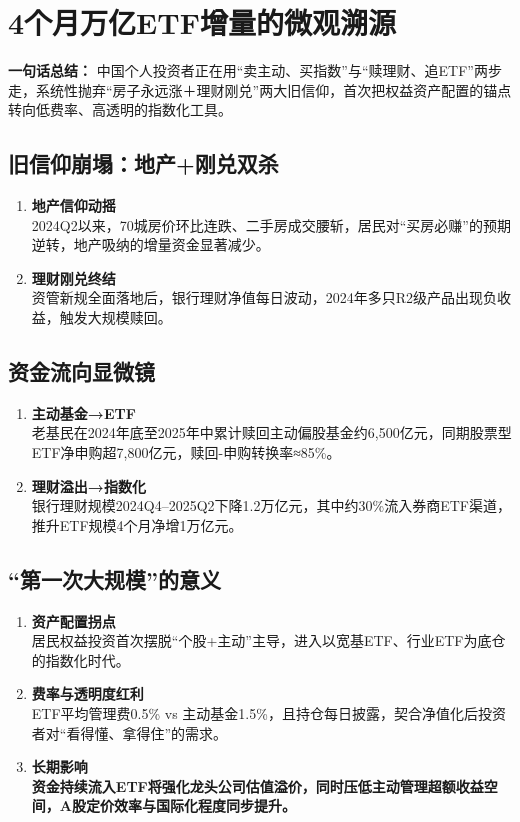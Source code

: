 \section{4个月万亿ETF增量的微观溯源}
\textbf{一句话总结：}  
中国个人投资者正在用“卖主动、买指数”与“赎理财、追ETF”两步走，系统性抛弃“房子永远涨＋理财刚兑”两大旧信仰，首次把权益资产配置的锚点转向低费率、高透明的指数化工具。

\subsection{旧信仰崩塌：地产+刚兑双杀}
\begin{enumerate}[leftmargin=*, nosep]
    \item \textbf{地产信仰动摇}  \\
    2024Q2以来，70城房价环比连跌、二手房成交腰斩，居民对“买房必赚”的预期逆转，地产吸纳的增量资金显著减少。
    \item \textbf{理财刚兑终结}  \\
    资管新规全面落地后，银行理财净值每日波动，2024年多只R2级产品出现负收益，触发大规模赎回。
\end{enumerate}

\subsection{资金流向显微镜}
\begin{enumerate}[leftmargin=*, nosep]
    \item \textbf{主动基金→ETF}  \\
    老基民在2024年底至2025年中累计赎回主动偏股基金约6,500亿元，同期股票型ETF净申购超7,800亿元，赎回-申购转换率≈85\%。
    \item \textbf{理财溢出→指数化}  \\
    银行理财规模2024Q4–2025Q2下降1.2万亿元，其中约30\%流入券商ETF渠道，推升ETF规模4个月净增1万亿元。
\end{enumerate}

\subsection{“第一次大规模”的意义}
\begin{enumerate}[leftmargin=*, nosep]
    \item \textbf{资产配置拐点}  \\
    {\color{red}居民权益投资首次摆脱“个股+主动”主导，进入以宽基ETF、行业ETF为底仓的指数化时代。}
    \item \textbf{费率与透明度红利}  \\
    {\color{red}ETF平均管理费0.5\% vs 主动基金1.5\%，且持仓每日披露，契合净值化后投资者对“看得懂、拿得住”的需求。}
    \item \textbf{长期影响}  \\
    {\color{red}\textbf{资金持续流入ETF将强化龙头公司估值溢价，同时压低主动管理超额收益空间，A股定价效率与国际化程度同步提升。}}
\end{enumerate}

